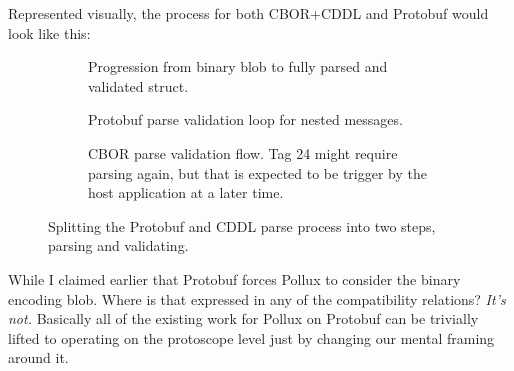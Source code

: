 \documentclass[11pt]{article}
\theoremstyle{definition}
\theoremstyle{plain}
\begin{document}
Represented visually, the process for both CBOR+CDDL and Protobuf would look
like this:

\begin{figure}[H]
  \centering
  \begin{subfigure}[b]{\textwidth}
    \centering
    \caption{Progression from binary blob to fully parsed and validated struct.}
  \end{subfigure}

  \begin{subfigure}[b]{0.4\textwidth}
    \centering
    \caption{Protobuf parse validation loop for nested messages.}
  \end{subfigure}
  \hspace{1cm}
  \begin{subfigure}[b]{0.4\textwidth}
    \centering
    \caption{CBOR parse validation flow. Tag 24 might require parsing again, but
    that is expected to be trigger by the host application at a later time.}
  \end{subfigure}

  \caption{Splitting the Protobuf and CDDL parse process into two steps, parsing
    and validating.}
  \label{fig:parse-validate}
\end{figure}

While I claimed earlier that Protobuf forces Pollux to consider the binary
encoding blob. Where is that expressed in any of the compatibility relations?
\emph{It's not.} Basically all of the existing work for Pollux on Protobuf can
be trivially lifted to operating on the protoscope level just by changing our
mental framing around it.

\printbibliography{}
\end{document}
